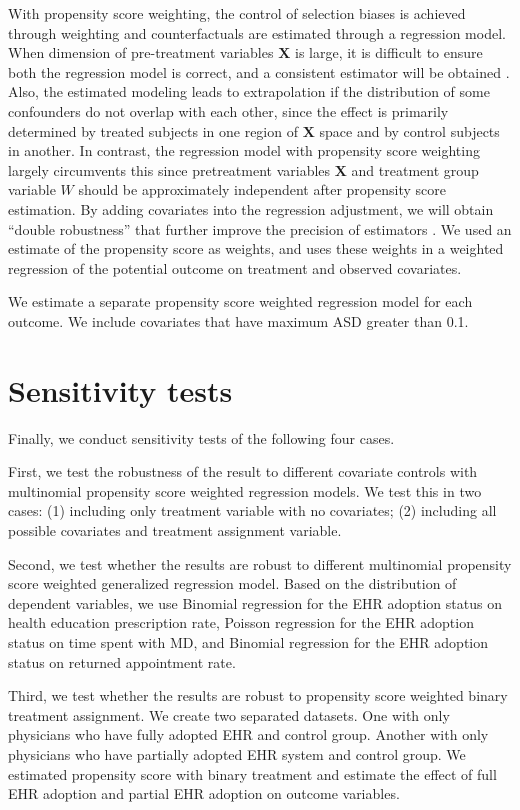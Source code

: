 \documentclass[12pt]{report}
\begin{document}
With propensity score weighting, the control of selection biases is achieved through weighting and counterfactuals are estimated through a regression model. When dimension of pre-treatment variables $\textbf{X}$ is large, it is difficult to ensure both the regression model is correct, and a consistent estimator will be obtained \citep{rubin1997estimating}. Also, the estimated modeling leads to extrapolation if the distribution of some confounders do not overlap with each other, since the effect is primarily determined by treated subjects in one region of $\textbf{X}$ space and by control subjects in another. In contrast, the regression model with propensity score weighting largely circumvents this since pretreatment variables $\textbf{X}$ and treatment group variable $W$ should be approximately independent after propensity score estimation. By adding covariates into the regression adjustment, we will obtain ``double robustness'' that further improve the precision of estimators \citep{lunceford2004stratification}. We used an estimate of the propensity score as weights, and uses these weights in a weighted regression of the potential outcome on treatment and observed covariates.

We estimate a separate propensity score weighted regression model for each outcome. We include covariates that have maximum ASD greater than 0.1. 

\section{Sensitivity tests}

Finally, we conduct sensitivity tests of the following four cases.

First, we test the robustness of the result to different covariate controls with multinomial propensity score weighted regression models. We test this in two cases: (1) including only treatment variable with no covariates; (2) including all possible covariates and treatment assignment variable.

Second, we test whether the results are robust to different multinomial propensity score weighted generalized regression model. Based on the distribution of dependent variables, we use Binomial regression for the EHR adoption status on health education prescription rate, Poisson regression for the EHR adoption status on time spent with MD, and Binomial regression for the EHR adoption status on returned appointment rate.

Third, we test whether the results are robust to propensity score weighted binary treatment assignment. We create two separated datasets. One with only physicians who have fully adopted EHR and control group. Another with only physicians who have partially adopted EHR system and control group. We estimated propensity score with binary treatment and estimate the effect of full EHR adoption and partial EHR adoption on outcome variables.
\end{document}
